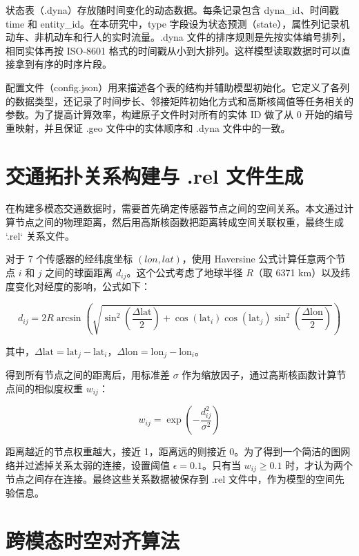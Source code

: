 状态表（.dyna）存放随时间变化的动态数据。每条记录包含 dyna\_id、时间戳 time 和 entity\_id。在本研究中，type 字段设为状态预测（state），属性列记录机动车、非机动车和行人的实时流量。.dyna 文件的排序规则是先按实体编号排列，相同实体再按 ISO-8601 格式的时间戳从小到大排列。这样模型读取数据时可以直接拿到有序的时序片段。

配置文件（config.json）用来描述各个表的结构并辅助模型初始化。它定义了各列的数据类型，还记录了时间步长、邻接矩阵初始化方式和高斯核阈值等任务相关的参数。为了提高计算效率，构建原子文件时对所有的实体 ID 做了从 0 开始的编号重映射，并且保证 .geo 文件中的实体顺序和 .dyna 文件中的一致。

\section{交通拓扑关系构建与 .rel 文件生成}

在构建多模态交通数据时，需要首先确定传感器节点之间的空间关系。本文通过计算节点之间的物理距离，然后用高斯核函数把距离转成空间关联权重，最终生成 `.rel` 关系文件。

对于 7 个传感器的经纬度坐标 $(lon, lat)$，使用 Haversine 公式计算任意两个节点 $i$ 和 $j$ 之间的球面距离 $d_{ij}$。这个公式考虑了地球半径 $R$（取 6371 km）以及纬度变化对经度的影响，公式如下：

\begin{equation}
d_{ij} = 2R \arcsin\left(\sqrt{\sin^2\left(\frac{\Delta \text{lat}}{2}\right) + \cos(\text{lat}_i) \cos(\text{lat}_j) \sin^2\left(\frac{\Delta \text{lon}}{2}\right)}\right)
\end{equation}

其中，$\Delta \text{lat} = \text{lat}_j - \text{lat}_i$，$\Delta \text{lon} = \text{lon}_j - \text{lon}_i$。

得到所有节点之间的距离后，用标准差 $\sigma$ 作为缩放因子，通过高斯核函数计算节点间的相似度权重 $w_{ij}$：

\begin{equation}
w_{ij} = \exp\left( -\frac{d_{ij}^2}{\sigma^2} \right)
\end{equation}

距离越近的节点权重越大，接近 1，距离远的则接近 0。为了得到一个简洁的图网络并过滤掉关系太弱的连接，设置阈值 $\epsilon = 0.1$。只有当 $w_{ij} \geq 0.1$ 时，才认为两个节点之间存在连接。最终这些关系数据被保存到 .rel 文件中，作为模型的空间先验信息。

\section{跨模态时空对齐算法}

